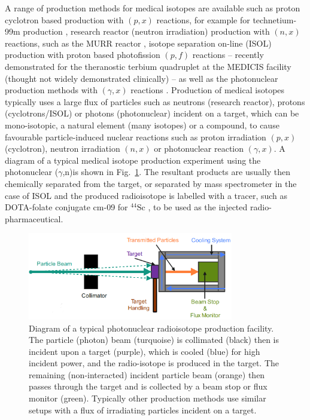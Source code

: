 \documentclass[../main.tex]{subfiles}
\begin{document}
A range of production methods for medical isotopes are available such as proton cyclotron based production  with $\left(p,x\right)$ reactions, for example for technetium-99m production \cite{gagnon2011cyclotron}, research reactor (neutron irradiation) production with $\left(n,x\right)$ reactions, such as the MURR reactor \cite{ma1996production}, isotope separation on-line (ISOL) production with  proton based photofission $\left(p,f\right)$ reactions -- recently demonstrated for the theranostic terbium quadruplet \cite{muller2012unique} at the MEDICIS facility \cite{dos2014cern} (thought not widely demonstrated clinically) -- as well as the photonuclear production methods with $\left(\gamma,x\right)$ reactions \cite{habs2011production}. Production of medical isotopes typically uses a large flux of particles such as neutrons (research reactor), protons (cyclotrons/ISOL) or photons (photonuclear) incident on a target, which can be mono-isotopic, a natural element (many isotopes) or a compound, to cause favourable particle-induced nuclear reactions such as proton irradiation $\left(p,x\right)$ (cyclotron), neutron irradiation $\left(n,x\right)$ or photonuclear reaction $\left(\gamma,x\right)$. A diagram of a typical medical isotope production experiment using the photonuclear ($\gamma$,n)is shown in Fig.~\ref{fig:isotope_production_diagram}. The resultant products are usually then chemically separated from the target, or separated by mass spectrometer in the case of ISOL \cite{catherall2017isolde} and the produced radioisotope is labelled with a tracer, such as DOTA-folate conjugate cm-09 for $^{44}\mathrm{Sc}$ \cite{muller2013folate}, to be used as the injected radio-pharmaceutical.  
\begin{figure}[!h]
\centering
\includegraphics[width=0.8\textwidth]{Figures/DIANA_Inverse_Compton_Source_Design/Isotope_Production_diagram_fixed.png}
\caption{Diagram of a typical photonuclear radioisotope production facility. The particle (photon) beam (turquoise) is collimated (black) then is incident upon a target (purple), which is cooled (blue) for high incident power, and the radio-isotope is produced in the target. The remaining (non-interacted) incident particle beam (orange) then passes through the target and is collected by a beam stop or flux monitor (green). Typically other production methods use similar setups with a flux of irradiating particles incident on a target.}
\label{fig:isotope_production_diagram}
\end{figure}
\end{document}
